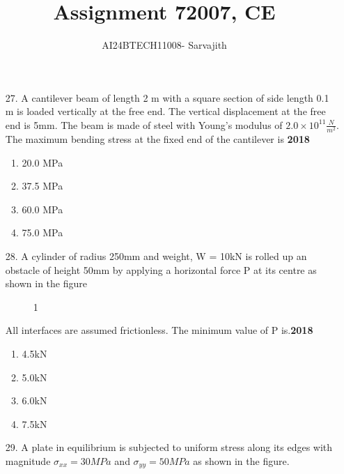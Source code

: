 \documentclass[journal]{IEEEtran}
\begin{document}

\vspace{3cm}


\author{AI24BTECH11008- Sarvajith
}
\title{Assignment 7}
{\let\newpage\relax\maketitle}
\title{2007, CE}
\renewcommand{\thefigure}{\theenumi}
\renewcommand{\thetable}{\theenumi}
\setlength{\intextsep}{10pt} %
\renewcommand{\thetable}{\theenumi}
\begin{enumerate}
    \item[27.] A cantilever beam of length 2 m with a square section of side length 0.1 m is loaded vertically at the free end. The vertical displacement at the free end is 5mm. The beam is made of steel with Young's modulus of $2.0\times 10^{11}\frac{N}{m^2}$. The maximum bending stress at the fixed end of the cantilever is \hfill \textbf{2018}
    \begin{enumerate}[label=(\Alph*)]
        \item 20.0 MPa
        \item 37.5 MPa
        \item 60.0 MPa
        \item 75.0 MPa
    \end{enumerate}
    \item[28.] A cylinder of radius 250mm and weight, W = 10kN is rolled up an obstacle of height 50mm by applying a horizontal force P at its centre as shown in the figure
    \begin{figure}[!ht]
        \centering
        \caption{1}
    \end{figure}
    All interfaces are assumed frictionless. The minimum value of P is.\hfill \textbf{2018}
    \begin{enumerate}[label=(\Alph*)]
        \item 4.5kN
        \item 5.0kN
        \item 6.0kN
        \item 7.5kN
    \end{enumerate}
    \item[29.] A plate in equilibrium is subjected to uniform stress along its edges with magnitude $\sigma_{xx}=30MPa$ and $\sigma_{yy}=50MPa$ as shown in the figure.

\end{enumerate}
\end{document}
